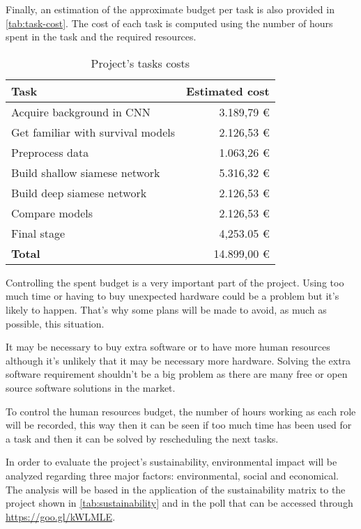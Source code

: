 Finally, an estimation of the approximate budget per task is also provided in 
\autoref{tab:task-cost}. The cost of each task is computed using the number of hours spent 
in the task and the required resources.

\begin{table}[H]
  \centering
  \begin{tabular}{|l|r|}
    \hline
    \textbf{Task} & \textbf{Estimated cost} \\ 
    \hline\hline

    Acquire background in CNN & 3.189,79 € \\ \hline
    Get familiar with survival models & 2.126,53 € \\ \hline
    Preprocess data & 1.063,26 € \\ \hline
    Build shallow siamese network & 5.316,32 € \\ \hline
    Build deep siamese network & 2.126,53 € \\ \hline
    Compare models & 2.126,53 € \\ \hline
    Final stage & 4,253.05 € \\ 

    \hline\hline
    \textbf{Total} & 14.899,00 € \\ \hline
  \end{tabular}

  \caption{Project's tasks costs \label{tab:task-cost}}
\end{table}


Controlling the spent budget is a very important part of the project. Using too much time or 
having to buy unexpected hardware could be a problem but it's likely to happen. That's why
some plans will be made to avoid, as much as possible, this situation.

It may be necessary to buy extra software or to have more human resources although it's
unlikely that it may be necessary more hardware. Solving the extra software requirement
shouldn't be a big problem as there are many free or open source software solutions in
the market.

To control the human resources budget, the number of hours working as each role will be 
recorded, this way then it can be seen if too much time has been used for a task and then
it can be solved by rescheduling the next tasks.


In order to evaluate the project's sustainability, environmental impact will be analyzed
regarding three major factors: environmental, social and economical. The analysis will be 
based in the application of the sustainability matrix to the project shown in
\autoref{tab:sustainability} and in the poll that can be accessed through 
\url{https://goo.gl/kWLMLE}.

